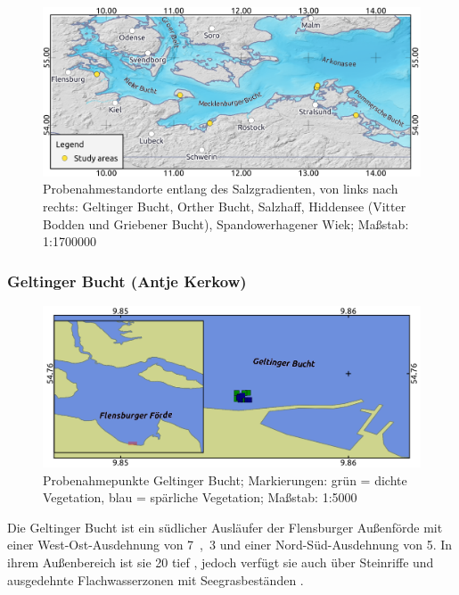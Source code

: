 \begin{figure}[htb]
\centering
\includegraphics[width=1\textwidth]{images/Uebersicht.png}
\caption[Übersichtskarte der Probenahmestandorte entlang des Salzgradienten]{Probenahmestandorte entlang des Salzgradienten, von links nach rechts: Geltinger Bucht, Orther Bucht, Salzhaff, Hiddensee (Vitter Bodden und Griebener Bucht), Spandowerhagener Wiek; Maßstab: 1:1700000}
\label{Uebersicht}
\end{figure}




\subsubsection{Geltinger Bucht (Antje Kerkow)}


\begin{figure}[htb]
\centering
\includegraphics[width=1\textwidth]{images/GB.png}
\caption[Probenahmepunkte Geltinger Bucht]{Probenahmepunkte Geltinger Bucht; Markierungen: grün = dichte Vegetation, blau = spärliche Vegetation; Maßstab: 1:5000}
\label{GB}
\end{figure}


Die Geltinger Bucht ist ein südlicher Ausläufer der Flensburger Außenförde mit einer West-Ost-Ausdehnung von \unit{7,3}{\kilo\metre} und einer Nord-Süd-Ausdehnung von \unit{5}{\kilo\metre}. In ihrem Außenbereich ist sie \unit{20}{\metre} tief \citep{nikulina_2009}, jedoch verfügt sie auch über Steinriffe und ausgedehnte Flachwasserzonen mit Seegrasbeständen \citep{landesbetriebfurkustenschutznationalparkundmeeresschutzschleswig-holstein_2013}.

